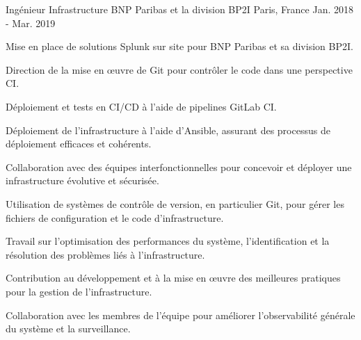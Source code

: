 \begin{cventries}
\cventry
{Ingénieur Infrastructure} %
{BNP Paribas et la division BP2I} %
{Paris, France} %
{Jan. 2018 - Mar. 2019} %
{
  \begin{cvitems} %
    \item {Mise en place de solutions Splunk sur site pour BNP Paribas et sa division BP2I.}
    \item {Direction de la mise en œuvre de Git pour contrôler le code dans une perspective CI.}
    \item {Déploiement et tests en CI/CD à l'aide de pipelines GitLab CI.}
    \item {Déploiement de l'infrastructure à l'aide d'Ansible, assurant des processus de déploiement efficaces et cohérents.}
    \item {Collaboration avec des équipes interfonctionnelles pour concevoir et déployer une infrastructure évolutive et sécurisée.}
    \item {Utilisation de systèmes de contrôle de version, en particulier Git, pour gérer les fichiers de configuration et le code d'infrastructure.}
    \item {Travail sur l'optimisation des performances du système, l'identification et la résolution des problèmes liés à l'infrastructure.}
    \item {Contribution au développement et à la mise en œuvre des meilleures pratiques pour la gestion de l'infrastructure.}
    \item {Collaboration avec les membres de l'équipe pour améliorer l'observabilité générale du système et la surveillance.}
  \end{cvitems}
}


\end{cventries}
